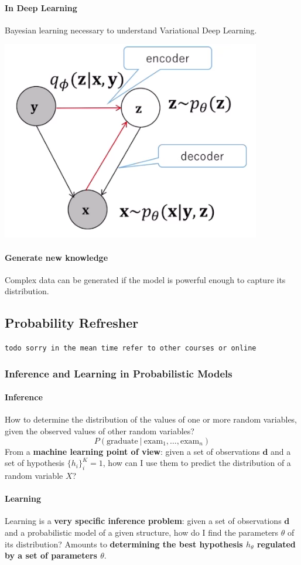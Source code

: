 \documentclass[10pt]{report}
\begin{document}
\paragraph{In Deep Learning} Bayesian learning necessary to understand Variational Deep Learning.
\begin{center}
	\includegraphics[scale=0.5]{14.png}
\end{center}
\paragraph{Generate new knowledge} Complex data can be generated if the model is powerful enough to capture its distribution.
\subsection{Probability Refresher}
\texttt{todo sorry in the mean time refer to other courses or online}
\subsubsection{Inference and Learning in Probabilistic Models}
\paragraph{Inference} How to determine the distribution of the values of one or more random variables, given the observed values of other random variables?
$$P(\text{graduate}\:|\:\text{exam}_1,\ldots,\text{exam}_n)$$
From a \textbf{machine learning point of view}: given a set of observations $\mathbf{d}$ and a set of hypothesis $\{h_i\}_i^K=1$, how can I use them to predict the distribution of a random variable $X$?
\paragraph{Learning} Learning is a \textbf{very specific inference problem}: given a set of observations $\mathbf{d}$ and a probabilistic model of a given structure, how do I find the parameters $\theta$ of its distribution? Amounts to \textbf{determining the best hypothesis $h_\theta$ regulated by a set of parameters $\theta$}.
\end{document}
